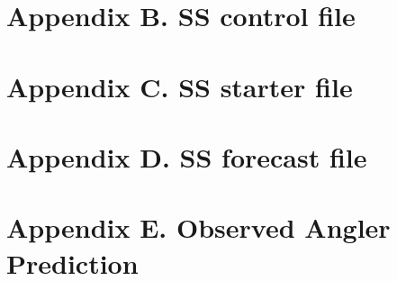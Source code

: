 \documentclass[12pt,]{article}
\begin{document}
\section*{Appendix B. SS control
file}\label{appendix-b.-ss-control-file}

\renewcommand{\thepage}{B-\arabic{page}}
\renewcommand{\thefigure}{B\arabic{figure}}
\renewcommand{\thetable}{B\arabic{table}}

\setcounter{page}{1} \setcounter{figure}{1} \setcounter{table}{1}

\newpage

\section*{Appendix C. SS starter
file}\label{appendix-c.-ss-starter-file}

\renewcommand{\thepage}{C-\arabic{page}}
\renewcommand{\thefigure}{C\arabic{figure}}
\renewcommand{\thetable}{C\arabic{table}}

\setcounter{page}{1} \setcounter{figure}{1} \setcounter{table}{1}

\newpage

\section*{Appendix D. SS forecast
file}\label{appendix-d.-ss-forecast-file}

\renewcommand{\thepage}{D-\arabic{page}}
\renewcommand{\thefigure}{D\arabic{figure}}
\renewcommand{\thetable}{D\arabic{table}}

\setcounter{page}{1} \setcounter{figure}{1} \setcounter{table}{1}

\newpage

\section*{Appendix E. Observed Angler
Prediction}\label{appendix-e.-observed-angler-prediction}

\renewcommand{\thepage}{E-\arabic{page}}
\renewcommand{\thefigure}{E\arabic{figure}}
\renewcommand{\thetable}{E\arabic{table}}

\setcounter{page}{1} \setcounter{figure}{1} \setcounter{table}{1}
\end{document}
